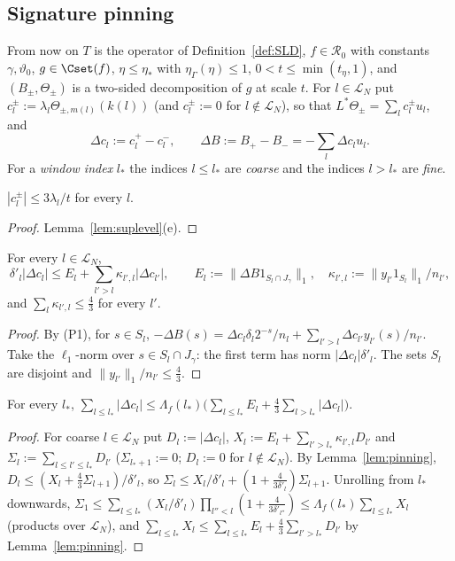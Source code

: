 
\subsection{Signature pinning}
From now on $T$ is the operator of Definition~\ref{def:SLD}, $f\in
\mathcal R_0$ with constants $\gamma,\vartheta_0$, $g\in\Cset(f)$,
$\eta\le\eta_*$ with $\eta_\Gamma(\eta)\le1$, $0<t\le\min(t_\eta,1)$, and
$(B_\pm,\Theta_\pm)$ is a two-sided decomposition of $g$ at scale $t$.  For
$l\in\mathcal L_N$ put $c^\pm_l:=\lambda_l\Theta_{\pm,m(l)}(k(l))$ (and
$c^\pm_l:=0$ for $l\notin\mathcal L_N$), so that $L^*\Theta_\pm=
\sum_lc^\pm_lu_l$, and
\[
 \Delta c_l:=c^+_l-c^-_l,\qquad \Delta B:=B_+-B_-=-\sum_l\Delta c_lu_l .
\]
For a \emph{window index} $l_*$ the indices $l\le l_*$ are \emph{coarse}
and the indices $l>l_*$ are \emph{fine}.

\begin{lemma}\label{lem:box}
$|c^\pm_l|\le3\lambda_l/t$ for every $l$.
\end{lemma}

\begin{proof}
Lemma~\ref{lem:suplevel}(e).
\end{proof}

\begin{lemma}\label{lem:pinning}
For every $l\in\mathcal L_N$,
\[
 \delta'_l|\Delta c_l|\le E_l+\sum_{l'>l}\kappa_{l',l}|\Delta c_{l'}|,\qquad
 E_l:=\|\Delta B1_{S_l\cap J_\gamma}\|_1,\quad\kappa_{l',l}:=
 \|y_{l'}1_{S_l}\|_1/n_{l'},
\]
and $\sum_l\kappa_{l',l}\le\frac43$ for every $l'$.
\end{lemma}

\begin{proof}
By (P1), for $s\in S_l$,
$-\Delta B(s)=\Delta c_l\delta_l2^{-s}/n_l+\sum_{l'>l}\Delta c_{l'}y_{l'}(s)/
n_{l'}$.  Take the $\ell_1$-norm over $s\in S_l\cap J_\gamma$: the first term
has norm $|\Delta c_l|\delta'_l$.  The sets $S_l$ are disjoint and
$\|y_{l'}\|_1/n_{l'}\le\frac43$.
\end{proof}

\begin{lemma}\label{lem:triangular}
For every $l_*$,
$\displaystyle\sum_{l\le l_*}|\Delta c_l|\le\Lambda_f(l_*)\Big(\sum_{l\le
l_*}E_l+\frac43\sum_{l>l_*}|\Delta c_l|\Big)$.
\end{lemma}

\begin{proof}
For coarse $l\in\mathcal L_N$ put $D_l:=|\Delta c_l|$, $X_l:=E_l+
\sum_{l'>l_*}\kappa_{l',l}D_{l'}$ and $\Sigma_l:=\sum_{l\le l'\le l_*}D_{l'}$
($\Sigma_{l_*+1}:=0$; $D_l:=0$ for $l\notin\mathcal L_N$).  By
Lemma~\ref{lem:pinning}, $D_l\le(X_l+\frac43\Sigma_{l+1})/\delta'_l$, so
$\Sigma_l\le X_l/\delta'_l+(1+\frac4{3\delta'_l})\Sigma_{l+1}$.  Unrolling
from $l_*$ downwards, $\Sigma_1\le\sum_{l\le l_*}(X_l/\delta'_l)\prod_{l''<l}
(1+\frac4{3\delta'_{l''}})\le\Lambda_f(l_*)\sum_{l\le l_*}X_l$ (products over
$\mathcal L_N$), and $\sum_{l\le l_*}X_l\le\sum_{l\le l_*}E_l+\frac43
\sum_{l'>l_*}D_{l'}$ by Lemma~\ref{lem:pinning}.
\end{proof}

